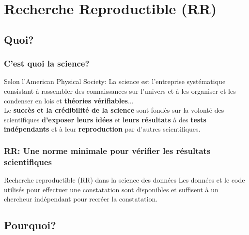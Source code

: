 \documentclass[10pt]{beamer}\usepackage[]{graphicx}\usepackage[]{color}
\begin{document}
\section{Recherche Reproductible (RR)}

\subsection{Quoi?}

\begin{frame}

\frametitle{C'est quoi la science?}

\pause
\begin{block}{Selon l'American Physical Society:}
La science est l'entreprise systématique consistant à rassembler des connaissances sur l'univers et à les organiser et les condenser en lois et \textbf{théories vérifiables}... \\ \pause
\vspace*{0.2in}	
Le \textbf{succès et la crédibilité de la science} sont fondés sur la volonté des scientifiques \textbf{d'exposer leurs idées} et \textbf{leurs résultats} à des \textbf{tests indépendants} et à leur \textbf{reproduction} par d'autres scientifiques.

\end{block}

\end{frame}

\begin{frame}

\frametitle{RR: Une norme minimale pour vérifier les résultats scientifiques}

\pause
\begin{block}{Recherche reproductible (RR) dans la science des données}
Les données et le code utilisés pour effectuer une constatation sont disponibles et suffisent à un chercheur indépendant pour recréer la constatation.
\end{block}

\end{frame}


\subsection{Pourquoi?}
\end{document}
